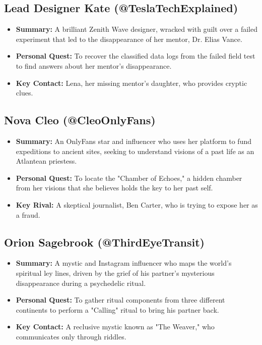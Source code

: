 \documentclass[10pt, a4paper]{article}
\begin{document}
\subsection*{Lead Designer Kate (@TeslaTechExplained)}
\begin{itemize}
    \item \textbf{Summary:} A brilliant Zenith Wave designer, wracked with guilt over a failed experiment that led to the disappearance of her mentor, Dr. Elias Vance.
    \item \textbf{Personal Quest:} To recover the classified data logs from the failed field test to find answers about her mentor's disappearance.
    \item \textbf{Key Contact:} Lena, her missing mentor's daughter, who provides cryptic clues.
\end{itemize}

\subsection*{Nova Cleo (@CleoOnlyFans)}
\begin{itemize}
    \item \textbf{Summary:} An OnlyFans star and influencer who uses her platform to fund expeditions to ancient sites, seeking to understand visions of a past life as an Atlantean priestess.
    \item \textbf{Personal Quest:} To locate the "Chamber of Echoes," a hidden chamber from her visions that she believes holds the key to her past self.
    \item \textbf{Key Rival:} A skeptical journalist, Ben Carter, who is trying to expose her as a fraud.
\end{itemize}

\subsection*{Orion Sagebrook (@ThirdEyeTransit)}
\begin{itemize}
    \item \textbf{Summary:} A mystic and Instagram influencer who maps the world's spiritual ley lines, driven by the grief of his partner's mysterious disappearance during a psychedelic ritual.
    \item \textbf{Personal Quest:} To gather ritual components from three different continents to perform a "Calling" ritual to bring his partner back.
    \item \textbf{Key Contact:} A reclusive mystic known as "The Weaver," who communicates only through riddles.
\end{itemize}
\end{document}
